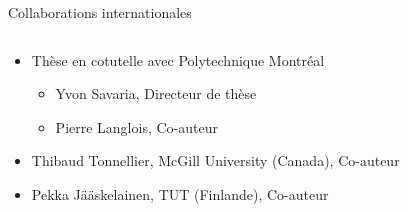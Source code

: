 \documentclass[t,compress,mathserif,12pt,xcolor=dvipsnames]{beamer}
\begin{document}
\begin{frame}[t]{Collaborations internationales}
  \begin{minipage}[t][5.0cm][t]{\textwidth}
    \begin{columns}[T]
      \begin{column}{0.63\textwidth}
        \begin{itemize}
          \item<+-> Thèse en cotutelle avec Polytechnique Montréal
          \begin{itemize}
          \item<1-> Yvon Savaria, Directeur de thèse
          \item<1-> Pierre Langlois, Co-auteur
          \end{itemize}
          \item<+-> Thibaud Tonnellier, McGill University (Canada), Co-auteur
          \item<+-> Pekka Jääskelainen, TUT (Finlande), Co-auteur
        \end{itemize}      \end{column}
      \begin{column}{0.04\textwidth}
      \end{column}
      \begin{column}{0.33\textwidth}
      \centering

\end{column}
\end{columns}
\end{minipage}
\end{frame}
\end{document}
